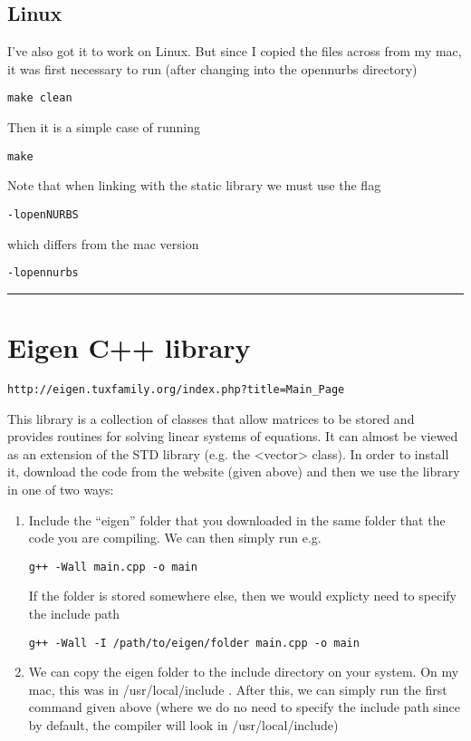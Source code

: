 \documentclass[a4paper, 10pt]{article}
\newcommand{\mybotrule}{\vspace{4mm}\hrule}
\begin{document}
\subsection*{Linux}

I've also got it to work on Linux. But since I copied the files across from my mac, it was first necessary to run (after changing into the opennurbs directory)
\begin{Verbatim}
make clean
\end{Verbatim}
Then it is a simple case of running
\begin{Verbatim}
make
\end{Verbatim}

Note that when linking with the static library we must use the flag
\begin{Verbatim}
-lopenNURBS
\end{Verbatim}
which differs from the mac version 
\begin{Verbatim}
-lopennurbs
\end{Verbatim}

\mybotrule

\vspace{10mm}
\section*{Eigen C++ library}
\begin{verbatim}
http://eigen.tuxfamily.org/index.php?title=Main_Page
\end{verbatim}

This library is a collection of classes that allow matrices to be stored and provides routines for solving linear systems of equations. It can almost be viewed as an extension of the STD library (e.g. the <vector> class). In order to install it, download the code from the website (given above) and then we use the library in one of two ways:
\begin{enumerate}
\item Include the ``eigen'' folder that you downloaded in the same folder that the code you are compiling. We can then simply run  e.g.
\begin{Verbatim}
g++ -Wall main.cpp -o main
\end{Verbatim}
If the folder is stored somewhere else, then we would explicty need to specify the include path
\begin{Verbatim}
g++ -Wall -I /path/to/eigen/folder main.cpp -o main
\end{Verbatim}
\item We can copy the eigen folder to the include directory on your system. On my mac, this was in /usr/local/include . After this, we can simply run the first command given above (where we do no need to specify the include path since by default, the compiler will look in /usr/local/include)
\end{enumerate}
\end{document}
